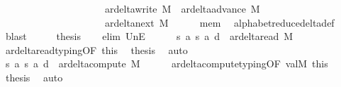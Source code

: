 \begin{isabellebody}
\ \ \ \ \ \ \ \ \ \ \ \ \ \ \ \ \ \ \ \ {\isasymunion}\ ar{\isacharunderscore}{\kern0pt}delta{\isacharunderscore}{\kern0pt}write\ M\ {\isasymunion}\ ar{\isacharunderscore}{\kern0pt}delta{\isacharunderscore}{\kern0pt}advance\ M\isanewline
\ \ \ \ \ \ \ \ \ \ \ \ \ \ \ \ \ \ \ \ {\isasymunion}\ ar{\isacharunderscore}{\kern0pt}delta{\isacharunderscore}{\kern0pt}next\ M{\isachardoublequoteclose}\isanewline
\ \ \ \ \isamarkupfalse%
\ mem\ \isamarkupfalse%
\ alphabet{\isacharunderscore}{\kern0pt}reduce{\isacharunderscore}{\kern0pt}delta{\isacharunderscore}{\kern0pt}def\ \isamarkupfalse%
\ blast\isanewline
\ \ \isamarkupfalse%
\ \isamarkupfalse%
\ {\isacharquery}{\kern0pt}thesis\isanewline
\ \ \isamarkupfalse%
\ {\isacharparenleft}{\kern0pt}elim\ UnE{\isacharparenright}{\kern0pt}\isanewline
\ \ \ \ \isamarkupfalse%
\ {\isachardoublequoteopen}{\isacharparenleft}{\kern0pt}s{\isacharcomma}{\kern0pt}\ a{\isacharcomma}{\kern0pt}\ s{\isacharprime}{\kern0pt}{\isacharcomma}{\kern0pt}\ a{\isacharprime}{\kern0pt}{\isacharcomma}{\kern0pt}\ d{\isacharparenright}{\kern0pt}\ {\isasymin}\ ar{\isacharunderscore}{\kern0pt}delta{\isacharunderscore}{\kern0pt}read\ M{\isachardoublequoteclose}\isanewline
\ \ \ \ \isamarkupfalse%
\ ar{\isacharunderscore}{\kern0pt}delta{\isacharunderscore}{\kern0pt}read{\isacharunderscore}{\kern0pt}typing{\isacharbrackleft}{\kern0pt}OF\ this{\isacharbrackright}{\kern0pt}\ \isamarkupfalse%
\ {\isacharquery}{\kern0pt}thesis\ \isamarkupfalse%
\ auto\isanewline
\ \ \isamarkupfalse%
\isanewline
\ \ \ \ \isamarkupfalse%
\ {\isachardoublequoteopen}{\isacharparenleft}{\kern0pt}s{\isacharcomma}{\kern0pt}\ a{\isacharcomma}{\kern0pt}\ s{\isacharprime}{\kern0pt}{\isacharcomma}{\kern0pt}\ a{\isacharprime}{\kern0pt}{\isacharcomma}{\kern0pt}\ d{\isacharparenright}{\kern0pt}\ {\isasymin}\ ar{\isacharunderscore}{\kern0pt}delta{\isacharunderscore}{\kern0pt}compute\ M{\isachardoublequoteclose}\isanewline
\ \ \ \ \isamarkupfalse%
\ ar{\isacharunderscore}{\kern0pt}delta{\isacharunderscore}{\kern0pt}compute{\isacharunderscore}{\kern0pt}typing{\isacharbrackleft}{\kern0pt}OF\ valM\ this{\isacharbrackright}{\kern0pt}\ \isamarkupfalse%
\ {\isacharquery}{\kern0pt}thesis\ \isamarkupfalse%
\ auto\isanewline
\ \ \isamarkupfalse%
\isanewline
\ \ \ \ \isamarkupfalse%

\end{isabellebody}
